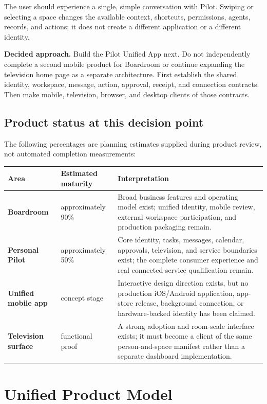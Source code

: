 \documentclass[11pt,a4paper]{article}
\newcommand{\decision}[1]{%
  \par\medskip\noindent
  \colorbox{pilotblue!9}{\parbox{0.94\linewidth}{\textbf{Decided approach.} #1}}%
  \par\medskip}
\begin{document}
The user should experience a single, simple conversation with Pilot.  Swiping
or selecting a space changes the available context, shortcuts, permissions,
agents, records, and actions; it does not create a different application or a
different identity.

\decision{Build the Pilot Unified App next.  Do not independently complete a
second mobile product for Boardroom or continue expanding the television home
page as a separate architecture.  First establish the shared identity,
workspace, message, action, approval, receipt, and connection contracts.  Then
make mobile, television, browser, and desktop clients of those contracts.}

\subsection{Product status at this decision point}

The following percentages are planning estimates supplied during product
review, not automated completion measurements:

\begin{center}
\begin{tabularx}{\textwidth}{@{}>{\bfseries}p{36mm}p{24mm}X@{}}
\toprule
Area & Estimated maturity & Interpretation \\
\midrule
Boardroom & approximately 90\% & Broad business features and operating model exist; unified identity, mobile review, external workspace participation, and production packaging remain. \\
Personal Pilot & approximately 50\% & Core identity, tasks, messages, calendar, approvals, television, and service boundaries exist; the complete consumer experience and real connected-service qualification remain. \\
Unified mobile app & concept stage & Interactive design direction exists, but no production iOS/Android application, app-store release, background connection, or hardware-backed identity has been claimed. \\
Television surface & functional proof & A strong adoption and room-scale interface exists; it must become a client of the same person-and-space manifest rather than a separate dashboard implementation. \\
\bottomrule
\end{tabularx}
\end{center}

\section{Unified Product Model}
\end{document}
